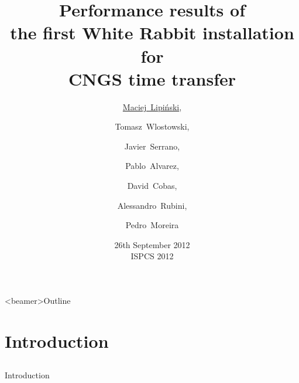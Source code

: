 \documentclass[compress,red]{beamer}
\title[White Rabbit @ CNGS \hspace{2em}\insertframenumber/\inserttotalframenumber]
{Performance results of \\the first White Rabbit installation for \\CNGS time transfer}
\institute{

   \begin{center}
    Hardware and Timing Section / ~~~ Institute of Electronic Systems \\
    ~~~~~~~~~~~~~~~~~~~~~CERN ~~~~~~~~~~~~~~~~ / ~~ Warsaw University of Technology \\
   \end{center}
% 
% 

}
\author[Maciej Lipi\'{n}ski]{\underline{Maciej~Lipi\'{n}ski},\and Tomasz~Wlostowski,\and 
Javier~Serrano,\and Pablo~Alvarez,\and David~Cobas,\and Alessandro~Rubini,\and Pedro~Moreira}
\date{26th September 2012 \\ ISPCS 2012}
\begin{document}
\frame{\titlepage}
\begin{frame}<beamer>{Outline}
    \tableofcontents %

\end{frame}

\section{Introduction}
\subsection{}
\begin{frame}{Introduction}

% 
% 
% 

\end{frame}
\end{document}
